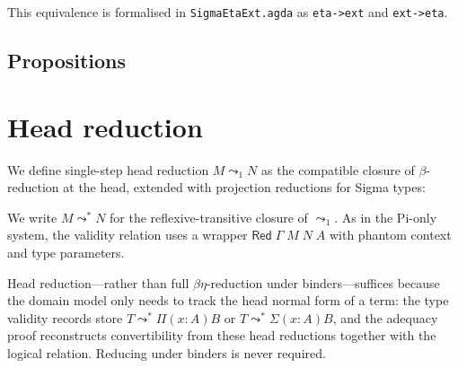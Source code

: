 \documentclass[11pt]{article}
\newcommand{\hastype}[3]{#1 \vdash #2 : #3}
\newcommand{\conveq}[4]{#1 \vdash #2 = #3 : #4}
\newcommand{\Pitype}[2]{\Pi(#1)#2}
\newcommand{\Lamterm}[2]{\lambda(#1)#2}
\newcommand{\App}[2]{#1\;#2}
\newcommand{\substone}[2]{#1[#2]}
\newcommand{\U}{\mathsf{U}}
\newcommand{\Prop}{\mathsf{Prop}}
\newcommand{\Red}{\mathrel{\leadsto^*}}
\newcommand{\Sigmatype}[2]{\Sigma(#1)#2}
\newcommand{\MkPair}[2]{\mathsf{pair}(#1,#2)}
\newcommand{\Fst}[1]{\mathsf{fst}(#1)}
\newcommand{\Snd}[1]{\mathsf{snd}(#1)}
\begin{document}
This equivalence is formalised in \texttt{SigmaEtaExt.agda} as
\texttt{eta->ext} and \texttt{ext->eta}.

\subsection*{Propositions}


\section{Head reduction}

We define single-step head reduction $M \leadsto_1 N$ as the
compatible closure of $\beta$-reduction at the head, extended with
projection reductions for Sigma types:

\noindent
We write $M \Red N$ for the reflexive-transitive closure of
$\leadsto_1$.  As in the Pi-only system, the validity relation uses
a wrapper $\mathsf{Red}\;\Gamma\;M\;N\;A$ with phantom context and
type parameters.

Head reduction---rather than full $\beta\eta$-reduction under
binders---suffices because the domain model only needs to track
the head normal form of a term: the type validity records store
$T \Red \Pitype{x{:}A}{B}$ or $T \Red \Sigmatype{x{:}A}{B}$,
and the adequacy proof reconstructs convertibility from these head
reductions together with the logical relation.  Reducing under
binders is never required.
\end{document}
